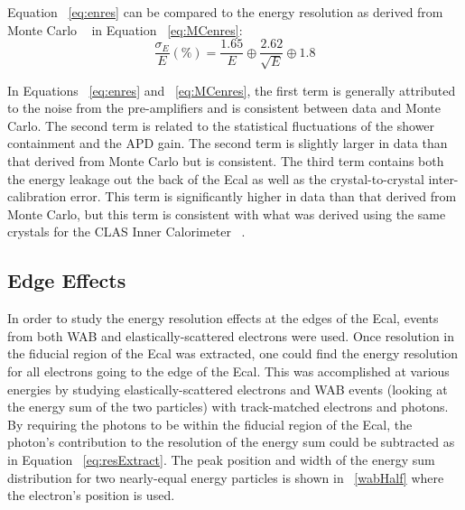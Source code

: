 \documentclass[twoside]{article}
\begin{document}
\begin{multicols}{2}
Equation ~\eqref{eq:enres} can be compared to the energy resolution as derived from Monte Carlo ~\cite{Garcon} in Equation ~\eqref{eq:MCenres}:
\begin{equation}
\label{eq:MCenres}
\dfrac{\sigma_E}{E}(\%)=\dfrac{1.65}{E}\oplus \dfrac{2.62}{\sqrt{E}} \oplus 1.8
\end{equation}
 
 In Equations ~\eqref{eq:enres} and ~\eqref{eq:MCenres}, the first term is generally attributed to the noise from the pre-amplifiers and is consistent between data and Monte Carlo. The second term is related to the statistical fluctuations of the shower containment and the APD gain. The second term is slightly larger in data than that derived from Monte Carlo but is consistent. The third term contains both the energy leakage out the back of the Ecal as well as the crystal-to-crystal inter-calibration error. This term is significantly higher in data than that derived from Monte Carlo, but this term is consistent with what was derived using the same crystals for the CLAS Inner Calorimeter ~\cite{FX}.
 
\subsection{Edge Effects} 
In order to study the energy resolution effects at the edges of the Ecal, events from both WAB and elastically-scattered electrons were used. Once resolution  in the fiducial region of the Ecal was extracted, one could find the energy resolution for all electrons going to the edge of the Ecal. This was accomplished at various energies by studying elastically-scattered electrons and WAB events (looking at the energy sum of the two particles) with track-matched electrons and photons. By requiring the photons to be within the fiducial region of the Ecal, the photon's contribution to the resolution of the energy sum could be subtracted as in Equation ~\eqref{eq:resExtract}. The peak position and width of the energy sum distribution for two nearly-equal energy particles is shown in ~\ref{wabHalf} where the electron's position is used.

\end{multicols}
\end{document}
